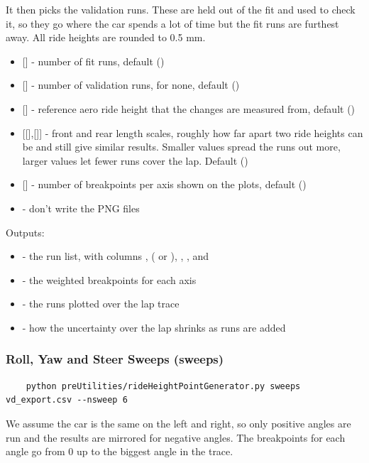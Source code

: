 It then picks the validation runs. These are held out of the fit and used to check it, so they go where the car spends a lot of time but the fit runs are furthest away. All ride heights are rounded to 0.5 mm.
\begin{itemize}
    \item {} [] - number of fit runs, default  ()
    \item {} [] - number of validation runs,  for none, default  ()
    \item {} [] - reference aero ride height that the changes are measured from, default  ()
    \item {} [[],[]] - front and rear length scales, roughly how far apart two ride heights can be and still give similar results. Smaller values spread the runs out more, larger values let fewer runs cover the lap. Default  ()
    \item {} [] - number of breakpoints per axis shown on the plots, default  ()
    \item {} - don't write the PNG files
\end{itemize}
Outputs:
\begin{itemize}
    \item {} - the run list, with columns ,  ( or ), , ,  and 
    \item {} - the weighted breakpoints for each axis
    \item {} - the runs plotted over the lap trace
    \item {} - how the uncertainty over the lap shrinks as runs are added
\end{itemize}

\subsubsection{Roll, Yaw and Steer Sweeps (sweeps)}
\begin{lstlisting}
    python preUtilities/rideHeightPointGenerator.py sweeps vd_export.csv --nsweep 6
\end{lstlisting}
We assume the car is the same on the left and right, so only positive angles are run and the results are mirrored for negative angles. The breakpoints for each angle go from 0 up to the biggest angle in the trace.

